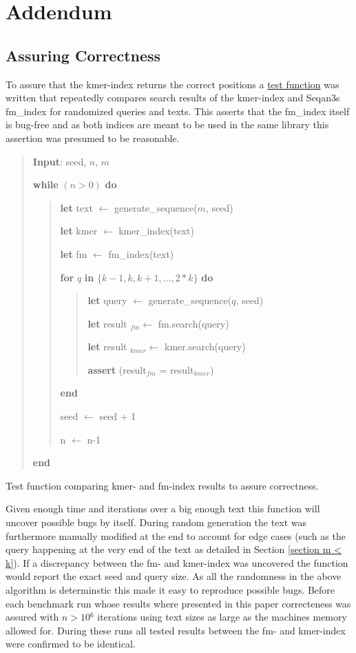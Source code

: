 
\chapter{Addendum}
\section{\label{Addendum: Correctness}Assuring Correctness}

To assure that the kmer-index returns the correct positions a \href{https://github.com/google/googletest}{test function}
was written that repeatedly compares search results of the kmer-index and
Seqan3s fm\_index for randomized queries and texts. This asserts that the
fm\_index itself is bug-free and as both indices are meant to be used
in the same library this assertion was presumed to be reasonable.

\begin{algorithm}[H]
\begin{verse}
\textbf{Input}: seed, $n$, $m$

\textbf{while} $(n>0)$ \textbf{do}
\begin{verse}
\textbf{let} text $\leftarrow$ generate\_sequence($m$, seed)

\textbf{let} kmer $\leftarrow$ kmer\_index(text)

\textbf{let} fm $\leftarrow$ fm\_index(text)

\textbf{for }$q$ \textbf{in} $\{k-1, k, k+1, ..., 2{*}k\}$ \textbf{do}
\begin{verse}
\textbf{let} query $\leftarrow$ generate\_sequence($q$, seed)

\textbf{let} result $_{fm}$$\leftarrow$ fm.search(query)

\textbf{let} result $_{kmer}$$\leftarrow$ kmer.search(query)

\textbf{assert} (result$_{fm}$ = result$_{kmer}$)
\end{verse}

\textbf{end}

seed $\leftarrow$ seed + 1

n $\leftarrow$ n-1
\end{verse}

\textbf{end}
\end{verse}
\caption{Test function comparing kmer- and fm-index results to assure correctness.}
\end{algorithm}

Given enough time and iterations over a big enough text this function will uncover possible bugs by itself.
During random generation the text was furthermore manually
modified at the end to account for edge cases (such
as the query happening at the very end of the text as detailed in
Section \ref{section m < k}). If a discrepancy between the fm- and kmer-index was uncovered
the function would report the exact seed and query size. As all the randomness in the above
algorithm is determinstic this made it easy to reproduce possible bugs. Before each benchmark run
whose results where presented in this paper correcteness was assured with $n>10{{}^6}$ iterations
using text sizes as large as the machines memory allowed for. During these runs all tested results between
the fm- and kmer-index were confirmed to be identical.

